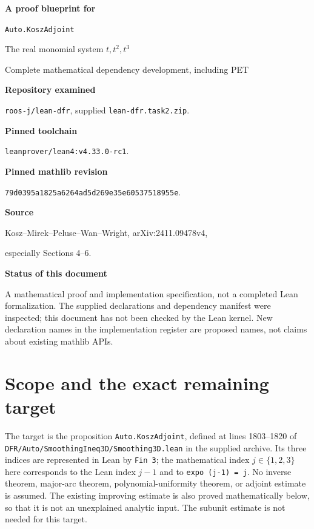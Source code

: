 \documentclass[11pt]{article}
\theoremstyle{definition}
\newcommand{\pid}[1]{\nolinkurl{#1}}
\begin{document}
\begin{titlepage}
\vspace*{1.3cm}
{\Huge\bfseries A proof blueprint for\par \texttt{Auto.KoszAdjoint}\par}
\vspace{0.9cm}
{\Large The real monomial system $t,t^2,t^3$\par}
\vspace{0.5cm}
{\large Complete mathematical dependency development, including PET\par}
\vspace{1.1cm}
\textbf{Repository examined}\par
\texttt{roos-j/lean-dfr}, supplied \texttt{lean-dfr.task2.zip}.\par
\textbf{Pinned toolchain}\par
\texttt{leanprover/lean4:v4.33.0-rc1}.\par
\textbf{Pinned mathlib revision}\par
{\small\pid{79d0395a1825a6264ad5d269e35e60537518955e}}.\par
\textbf{Source}\par
Kosz--Mirek--Peluse--Wan--Wright, arXiv:2411.09478v4,\par
especially Sections 4--6.\par
\vfill
\textbf{Status of this document}\par
A mathematical proof and implementation specification, not a completed Lean formalization.
The supplied declarations and dependency manifest were inspected; this document has not been checked
by the Lean kernel. New declaration names in the implementation register are proposed names, not claims
about existing mathlib APIs.
\vspace{0.6cm}
\end{titlepage}
\setcounter{tocdepth}{2}\tableofcontents\clearpage
\section*{Scope and the exact remaining target}
The target is the proposition \pid{Auto.KoszAdjoint}, defined at lines 1803--1820 of
\pid{DFR/Auto/SmoothingIneq3D/Smoothing3D.lean} in the supplied archive.
Its three indices are represented in Lean by \pid{Fin 3}; the mathematical index $j\in\{1,2,3\}$
here corresponds to the Lean index $j-1$ and to \pid{expo (j-1) = j}.
No inverse theorem, major-arc theorem, polynomial-uniformity theorem, or adjoint estimate is assumed.
The existing improving estimate is also proved mathematically below, so that it is not an unexplained
analytic input. The subunit estimate is not needed for this target.
\end{document}
